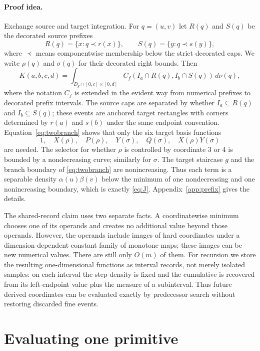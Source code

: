\documentclass[12pt,a4paper]{article}
\theoremstyle{definition}
\newcommand{\1}{\mathbf 1}
\begin{document}
\paragraph{Proof idea.}
Exchange source and target integration.  For $q=(u,v)$ let $R(q)$ and $S(q)$ be the decorated source prefixes
\[
R(q)=\{x:q\prec r(x)\},\qquad S(q)=\{y:q\prec s(y)\},
\]
where $\prec$ means componentwise membership below the strict decorated caps.  We write $\rho(q)$ and $\sigma(q)$ for their decorated right bounds.  Then
\[
K(a,b,c,d)=\int_{D_g\cap[0,c]\times[0,d]}
C_f(I_a\cap R(q),I_b\cap S(q))\,d\nu(q),
\]
where the notation $C_f$ is extended in the evident way from numerical prefixes to decorated prefix intervals.  The source caps are separated by whether $I_a\subseteq R(q)$ and $I_b\subseteq S(q)$; these events are anchored target rectangles with corners determined by $r(a)$ and $s(b)$ under the same endpoint convention. Equation~\eqref{eq:twobranch} shows that only the six target basis functions
\[
1,\quad X(\rho),\quad P(\rho),\quad Y(\sigma),\quad Q(\sigma),\quad X(\rho)Y(\sigma)
\]
are needed. The selector for whether $\rho$ is controlled by coordinate 3 or 4 is bounded by a nondecreasing curve; similarly for $\sigma$. The target staircase $g$ and the branch boundary of \eqref{eq:twobranch} are nonincreasing. Thus each term is a separable density $\alpha(u)\beta(v)$ below the minimum of one nondecreasing and one nonincreasing boundary, which is exactly \eqref{eq:J}. Appendix~\ref{app:prefix} gives the details.

The shared-record claim uses two separate facts.  A coordinatewise minimum chooses one of its operands and creates no additional value beyond those operands.  However, the operands include images of hard coordinates under a dimension-dependent constant family of monotone maps; these images can be new numerical values.  There are still only $O(m)$ of them.  For recursion we store the resulting one-dimensional functions as interval records, not merely isolated samples: on each interval the step density is fixed and the cumulative is recovered from its left-endpoint value plus the measure of a subinterval. Thus future derived coordinates can be evaluated exactly by predecessor search without restoring discarded fine events.

\section{Evaluating one primitive}
\end{document}
